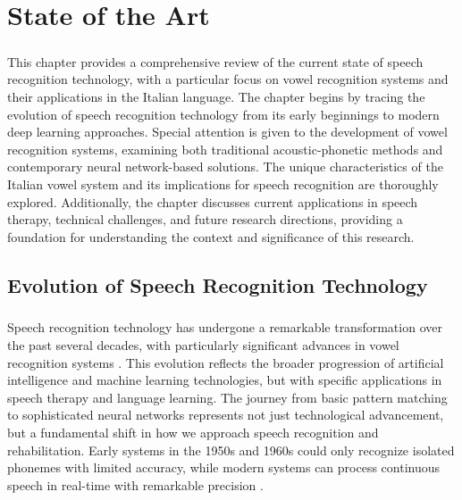 
\chapter{State of the Art}
\label{chp:stateOfArt}

\paragraph{}
This chapter provides a comprehensive review of the current state of speech recognition technology, with a particular focus on vowel recognition systems and their applications in the Italian language. The chapter begins by tracing the evolution of speech recognition technology from its early beginnings to modern deep learning approaches. Special attention is given to the development of vowel recognition systems, examining both traditional acoustic-phonetic methods and contemporary neural network-based solutions. The unique characteristics of the Italian vowel system and its implications for speech recognition are thoroughly explored. Additionally, the chapter discusses current applications in speech therapy, technical challenges, and future research directions, providing a foundation for understanding the context and significance of this research.

\section{Evolution of Speech Recognition Technology}
\label{sec:evolution}

\paragraph{}
Speech recognition technology has undergone a remarkable transformation over the past several decades, with particularly significant advances in vowel recognition systems \cite{deep_speech2023}. This evolution reflects the broader progression of artificial intelligence and machine learning technologies, but with specific applications in speech therapy and language learning. The journey from basic pattern matching to sophisticated neural networks represents not just technological advancement, but a fundamental shift in how we approach speech recognition and rehabilitation. Early systems in the 1950s and 1960s could only recognize isolated phonemes with limited accuracy, while modern systems can process continuous speech in real-time with remarkable precision \cite{acoustic_analysis2023}.

